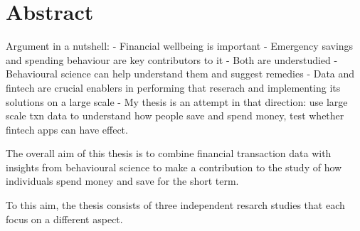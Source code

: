 
\chapter*{Abstract}%
\label{cha:abstract}

Argument in a nutshell:
- Financial wellbeing is important
- Emergency savings and spending behaviour are key contributors to it
- Both are understudied
- Behavioural science can help understand them and suggest remedies
- Data and fintech are crucial enablers in performing that reserach and
implementing its solutions on a large scale
- My thesis is an attempt in that direction: use large scale txn data to
understand how people save and spend money, test whether fintech apps can have
effect.

The overall aim of this thesis is to combine financial transaction data with
insights from behavioural science to make a contribution to the study of how
individuals spend money and save for the short term.

To this aim, the thesis consists of three independent resarch studies that each
focus on a different aspect.


